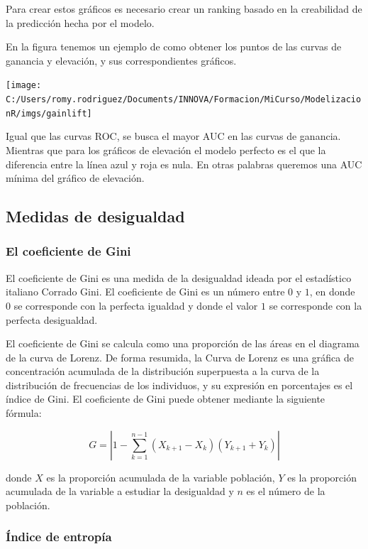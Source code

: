 \documentclass[]{book}
\begin{document}
Para crear estos gráficos es necesario crear un ranking basado en la creabilidad de la predicción hecha por el modelo.

En la figura tenemos un ejemplo de como obtener los puntos de las curvas de ganancia y elevación, y sus correspondientes gráficos.

\texttt{[image: C:/Users/romy.rodriguez/Documents/INNOVA/Formacion/MiCurso/ModelizacionR/imgs/gainlift]}

Igual que las curvas ROC, se busca el mayor AUC en las curvas de ganancia. Mientras que para los gráficos de elevación el modelo perfecto es el que la diferencia entre la línea azul y roja es nula. En otras palabras queremos una AUC mínima del gráfico de elevación.

\hypertarget{medidas-de-desigualdad}{%
\subsection{Medidas de desigualdad}\label{medidas-de-desigualdad}}

\hypertarget{el-coeficiente-de-gini}{%
\subsubsection{El coeficiente de Gini}\label{el-coeficiente-de-gini}}

El coeficiente de Gini es una medida de la desigualdad ideada por el estadístico italiano Corrado Gini. El coeficiente de Gini es un número entre \(0\) y \(1\), en donde \(0\) se corresponde con la perfecta igualdad y donde el valor \(1\) se corresponde con la perfecta desigualdad.

El coeficiente de Gini se calcula como una proporción de las áreas en el diagrama de la curva de Lorenz. De forma resumida, la Curva de Lorenz es una gráfica de concentración acumulada de la distribución superpuesta a la curva de la distribución de frecuencias de los individuos, y su expresión en porcentajes es el índice de Gini. El coeficiente de Gini puede obtener mediante la siguiente fórmula:

\[G = \left| 1-\sum_{k=1}^{n-1} (X_{k+1}-X_k)(Y_{k+1}+Y_k) \right|\]

donde \(X\) es la proporción acumulada de la variable población, \(Y\) es la proporción acumulada de la variable a estudiar la desigualdad y \(n\) es el número de la población.

\hypertarget{indice-de-entropia}{%
\subsubsection{Índice de entropía}\label{indice-de-entropia}}
\end{document}
